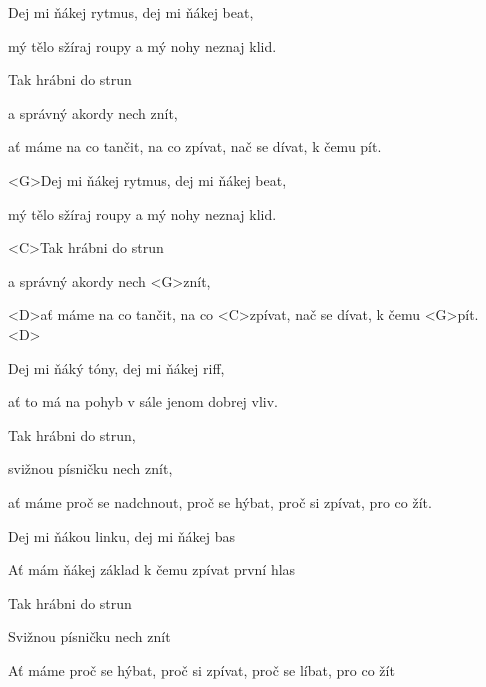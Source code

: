 

\ifdefined\TPBAND
\zs
Dej mi ňákej rytmus, dej mi ňákej beat,

mý tělo sžíraj roupy a mý nohy neznaj klid.

Tak hrábni do strun

a správný akordy nech znít,

ať máme na co tančit, na co zpívat, nač se dívat, k čemu pít.
\ks

\else
\zs
<G>Dej mi ňákej rytmus, dej mi ňákej beat,

mý tělo sžíraj roupy a mý nohy neznaj klid.

<C>Tak hrábni do strun

a správný akordy nech <G>znít,

<D>ať máme na co tančit, na co <C>zpívat, nač se dívat, k čemu <G>pít. <D>
\ks
\fi

\zs
Dej mi ňáký tóny, dej mi ňákej riff,

ať to má na pohyb v sále jenom dobrej vliv.

Tak hrábni do strun,

svižnou písničku nech znít,

ať máme proč se nadchnout, proč se hýbat, proč si zpívat, pro co žít.
\ks

\zs
Dej mi ňákou linku, dej mi ňákej bas

Ať mám ňákej základ k čemu zpívat první hlas

Tak hrábni do strun

Svižnou písničku nech znít

Ať máme proč se hýbat, proč si zpívat, proč se líbat, pro co žít
\ks

\kp
